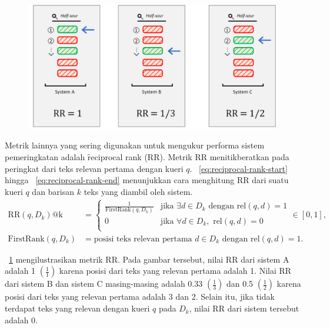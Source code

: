         \begin{figure}
            \centering
            \includegraphics[width=1\textwidth]{assets/pics/rr.png}
            \label{fig:reciprocal-rank}
        \end{figure}
        Metrik lainnya yang sering digunakan untuk mengukur performa sistem pemeringkatan adalah \f{reciprocal rank} (RR). Metrik RR menitikberatkan pada peringkat dari teks relevan pertama dengan kueri $q$. \equ~\ref{eq:reciprocal-rank-start} hingga \equ~\ref{eq:reciprocal-rank-end} menunjukkan cara menghitung RR dari suatu kueri $q$ dan barisan $k$ teks yang diambil oleh sistem.
        \begin{align}
            \text{RR}(q, D_k)\text{@k} &= \begin{cases}
                \label{eq:reciprocal-rank-start}
                \frac{1}{\text{FirstRank}(q, D_k)} & \text{jika } \exists d \in D_k \text{ dengan } \text{rel}(q, d) = 1 \\        
                0 & \text{jika } \forall d \in D_k, \text{ rel}(q, d) = 0 \\
                \end{cases} \in [0, 1], \\
                \label{eq:reciprocal-rank-end}
                \text{FirstRank}(q,D_k) &= \text{posisi teks relevan pertama } d\in D_k \text{ dengan } \text{rel}(q, d) = 1.
        \end{align}

        \pic~\ref{fig:reciprocal-rank} mengilustrasikan metrik RR. Pada gambar tersebut, nilai RR dari sistem A adalah 1 $(\frac{1}{1})$ karena posisi dari teks yang relevan pertama adalah 1. Nilai RR dari sistem B dan sistem C masing-masing adalah  0.33 $(\frac{1}{3})$ dan 0.5 $(\frac{1}{2})$ karena posisi dari teks yang relevan pertama adalah 3 dan 2. Selain itu, jika tidak terdapat teks yang relevan dengan kueri $q$ pada $D_k$, nilai RR dari sistem tersebut adalah 0. 

